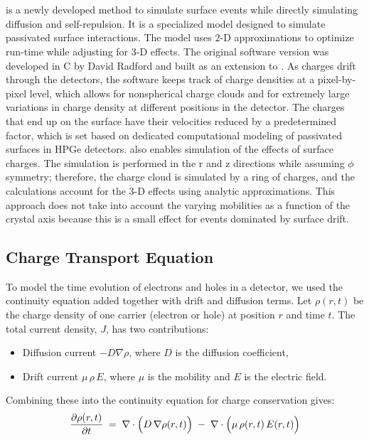 \section{{\ehd}}
{\ehd} is a newly developed method to simulate surface events while directly simulating diffusion and self-repulsion. It is a specialized model designed to simulate passivated surface interactions. The model uses $2$-D approximations to optimize run-time while adjusting for $3$-D effects. The original software version was developed in C by David Radford and built as an extension to {\siggen}. As charges drift through the detectors, the software keeps track of charge densities at a pixel-by-pixel level, which allows for nonspherical charge clouds and for extremely large variations in charge density at different positions in the detector. The charges that end up on the surface have their velocities reduced by a predetermined factor, which is set based on dedicated computational modeling of passivated surfaces in HPGe detectors. {\ehd} also enables simulation of the effects of surface charges. The simulation is performed in the r and z directions while assuming $\phi$ symmetry; therefore, the charge cloud is simulated by a ring of charges, and the calculations account for the $3$-D effects using analytic approximations. This approach does not take into account the varying mobilities as a function of the crystal axis because this is a small effect for events dominated by surface drift.


\subsection{Charge Transport Equation}
\label{sec:charge_transport_eq}
To model the time evolution of electrons and holes in a detector, we used the continuity equation added together with drift and diffusion terms. Let $\rho(r,t)$ be the charge density of one carrier (electron or hole) at position $r$ and time $t$. The total current density, $J$, has two contributions: 

\begin{itemize}
  \item Diffusion current $-D\nabla \rho$, where $D$ is the diffusion coefficient,
  \item Drift current $\mu\,\rho\,E$, where $\mu$ is the mobility and $E$ is the electric field. 
\end{itemize}

Combining these into the continuity equation for charge conservation gives:
\begin{equation}
\label{ch3_eq_charge_transport}
\frac{\partial \rho(r,t)}{\partial t}
\;=\;
\nabla \cdot \Bigl(D\,\nabla\rho(r,t)\Bigr)
\;-\;
\nabla \cdot \Bigl(\mu\,\rho(r,t)\,{E}(r,t)\Bigr)
\end{equation}

